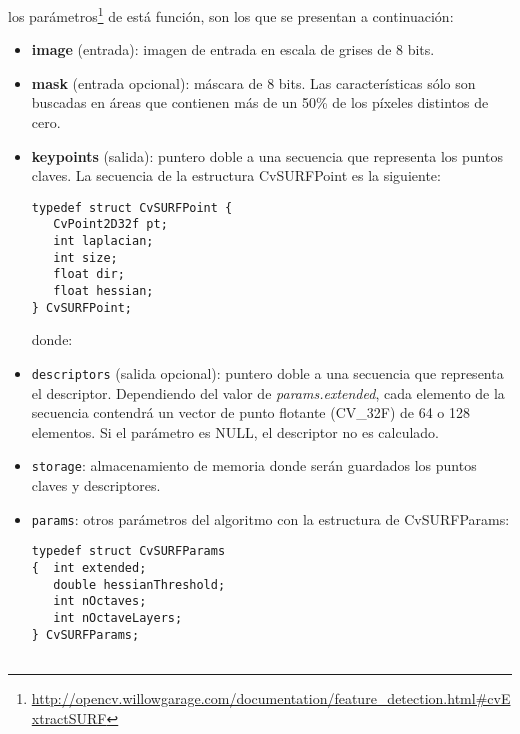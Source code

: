 \noindent los parámetros\footnote{\url{http://opencv.willowgarage.com/documentation/feature_detection.html\#cvExtractSURF}} de est\'a funci\'on, son los que se presentan a continuación:
\begin{itemize}
 \item \textbf{image} (entrada): imagen de entrada en escala de grises de 8 bits.
 \item \textbf{mask} (entrada opcional): máscara de 8 bits. Las características sólo son buscadas en áreas que contienen más de un 50\% de los píxeles distintos de cero.
  \item \textbf{keypoints} (salida): puntero doble a una secuencia que representa los puntos claves. La secuencia de la estructura CvSURFPoint es la siguiente:
\begin{lstlisting}
typedef struct CvSURFPoint {
   CvPoint2D32f pt;
   int laplacian;
   int size;
   float dir;
   float hessian;
} CvSURFPoint;
\end{lstlisting}
donde:

\item \texttt{descriptors} (salida opcional): puntero doble a una secuencia que representa el descriptor. 
Dependiendo del valor de \emph{params.extended}, cada elemento de la secuencia contendrá un vector de punto flotante (CV\_32F) de 64 o 128 elementos. Si el parámetro es NULL, el descriptor no es calculado.
\item \texttt{storage}: almacenamiento de memoria donde serán guardados los puntos claves y descriptores.
\item \texttt{params}: otros parámetros del algoritmo con la estructura de CvSURFParams:
\begin{lstlisting}
typedef struct CvSURFParams
{  int extended;
   double hessianThreshold;
   int nOctaves;
   int nOctaveLayers;
} CvSURFParams;


\end{lstlisting}
\end{itemize}
